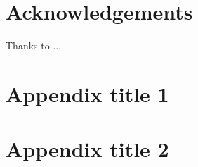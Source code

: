 \documentclass[final,8p,times,twocolumn,authoryear]{elsarticle}
\begin{document}
\section*{Acknowledgements}
Thanks to ...

\appendix

\section{Appendix title 1}

\section{Appendix title 2}

 







\end{document}
